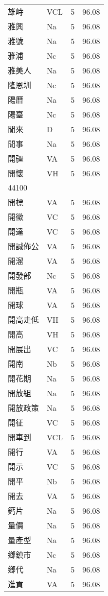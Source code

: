 \documentclass[twocolumn]{book}
\begin{document}
\begin{supertabular}{llrr}
雄峙 & VCL & 5 &  96.08\\
雅興 & Na & 5 &  96.08\\
雅號 & Na & 5 &  96.08\\
雅浦 & Nc & 5 &  96.08\\
雅美人 & Na & 5 &  96.08\\
隆恩圳 & Nc & 5 &  96.08\\
陽曆 & Na & 5 &  96.08\\
陽臺 & Nc & 5 &  96.08\\
閒來 & D & 5 &  96.08\\
閒事 & Na & 5 &  96.08\\
開疆 & VA & 5 &  96.08\\
開懷 & VH & 5 &  96.08\\
44100\\
開標 & VA & 5 &  96.08\\
開徵 & VC & 5 &  96.08\\
開達 & VC & 5 &  96.08\\
開誠佈公 & VA & 5 &  96.08\\
開溜 & VA & 5 &  96.08\\
開發部 & Nc & 5 &  96.08\\
開瓶 & VA & 5 &  96.08\\
開球 & VA & 5 &  96.08\\
開高走低 & VH & 5 &  96.08\\
開高 & VH & 5 &  96.08\\
開展出 & VC & 5 &  96.08\\
開南 & Nb & 5 &  96.08\\
開花期 & Na & 5 &  96.08\\
開放組 & Na & 5 &  96.08\\
開放政策 & Na & 5 &  96.08\\
開征 & VC & 5 &  96.08\\
開車到 & VCL & 5 &  96.08\\
開行 & VA & 5 &  96.08\\
開示 & VC & 5 &  96.08\\
開平 & Nb & 5 &  96.08\\
開去 & VA & 5 &  96.08\\
鈣片 & Na & 5 &  96.08\\
量價 & Na & 5 &  96.08\\
量產型 & Na & 5 &  96.08\\
鄉鎮市 & Nc & 5 &  96.08\\
鄉代 & Na & 5 &  96.08\\
進貢 & VA & 5 &  96.08\\

\end{supertabular}
\end{document}
